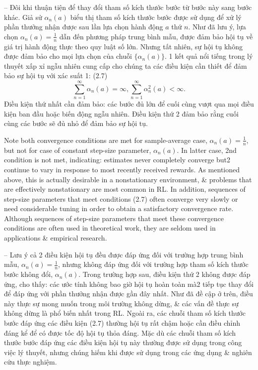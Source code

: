 \documentclass{article}
\begin{document}
\begin{itemize}
\begin{itemize}
        -- Đôi khi thuận tiện để thay đổi tham số kích thước bước từ bước này sang bước khác. Giả sử $\alpha_n(a)$ biểu thị tham số kích thước bước được sử dụng để xử lý phần thưởng nhận được sau lần lựa chọn hành động $a$ thứ $n$. Như đã lưu ý, lựa chọn $\alpha_n(a) = \frac{1}{n}$ dẫn đến phương pháp trung bình mẫu, được đảm bảo hội tụ về giá trị hành động thực theo quy luật số lớn. Nhưng tất nhiên, sự hội tụ không được đảm bảo cho mọi lựa chọn của chuỗi $\{\alpha_n(a)\}$. 1 kết quả nổi tiếng trong lý thuyết xấp xỉ ngẫu nhiên cung cấp cho chúng ta các điều kiện cần thiết để đảm bảo sự hội tụ với xác suất 1: (2.7)
        \begin{equation*}
            \sum_{n=1}^\infty \alpha_n(a) = \infty, \sum_{n=1}^\infty \alpha_n^2(a) < \infty.
        \end{equation*}
        Điều kiện thứ nhất cần đảm bảo: các bước đủ lớn để cuối cùng vượt qua mọi điều kiện ban đầu hoặc biến động ngẫu nhiên. Điều kiện thứ 2 đảm bảo rằng cuối cùng các bước sẽ đủ nhỏ để đảm bảo sự hội tụ.

        Note both convergence conditions are met for sample-average case, $\alpha_n(a) = \frac{1}{n}$, but not for case of constant step-size parameter, $\alpha_n(a)$. In latter case, 2nd condition is not met, indicating: estimates never completely converge but2 continue to vary in response to most recently received rewards. As mentioned above, this is actually desirable in a nonstationary environment, \& problems that are effectively nonstationary are most common in RL. In addition, sequences of step-size parameters that meet conditions (2.7) often converge very slowly or need considerable tuning in order to obtain a satisfactory convergence rate. Although sequences of step-size parameters that meet these convergence conditions are often used in theoretical work, they are seldom used in applications \& empirical research.

        -- Lưu ý cả 2 điều kiện hội tụ đều được đáp ứng đối với trường hợp trung bình mẫu, $\alpha_n(a) = \frac{1}{n}$, nhưng không đáp ứng đối với trường hợp tham số kích thước bước không đổi, $\alpha_n(a)$. Trong trường hợp sau, điều kiện thứ 2 không được đáp ứng, cho thấy: các ước tính không bao giờ hội tụ hoàn toàn mà2 tiếp tục thay đổi để đáp ứng với phần thưởng nhận được gần đây nhất. Như đã đề cập ở trên, điều này thực sự mong muốn trong môi trường không dừng, \& các vấn đề thực sự không dừng là phổ biến nhất trong RL. Ngoài ra, các chuỗi tham số kích thước bước đáp ứng các điều kiện (2.7) thường hội tụ rất chậm hoặc cần điều chỉnh đáng kể để có được tốc độ hội tụ thỏa đáng. Mặc dù các chuỗi tham số kích thước bước đáp ứng các điều kiện hội tụ này thường được sử dụng trong công việc lý thuyết, nhưng chúng hiếm khi được sử dụng trong các ứng dụng \& nghiên cứu thực nghiệm.


\end{itemize}
\end{itemize}
\end{document}
